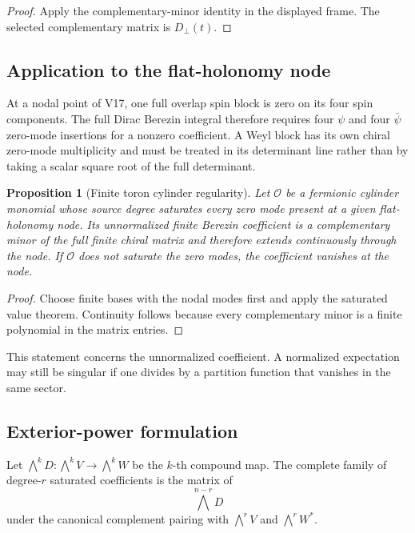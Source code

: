 \documentclass[11pt]{article}
\newtheorem{proposition}[theorem]{Proposition}
\begin{document}
\begin{proof}
Apply the complementary-minor identity in the displayed frame.  The
selected complementary matrix is \(D_\perp(t)\).
\end{proof}

\subsection{Application to the flat-holonomy node}

At a nodal point of V17, one full overlap spin block is zero on its four
spin components.  The full Dirac Berezin integral therefore requires four
\(\psi\) and four \(\bar\psi\) zero-mode insertions for a nonzero
coefficient.  A Weyl block has its own chiral zero-mode multiplicity and
must be treated in its determinant line rather than by taking a scalar
square root of the full determinant.

\begin{proposition}[Finite toron cylinder regularity]
\label{prop:v11v18-toron-regularity}
Let \(\mathcal O\) be a fermionic cylinder monomial whose source degree
saturates every zero mode present at a given flat-holonomy node.  Its
unnormalized finite Berezin coefficient is a complementary minor of the
full finite chiral matrix and therefore extends continuously through the
node.  If \(\mathcal O\) does not saturate the zero modes, the coefficient
vanishes at the node.
\end{proposition}

\begin{proof}
Choose finite bases with the nodal modes first and apply the saturated
value theorem.  Continuity follows because every complementary minor is
a finite polynomial in the matrix entries.
\end{proof}

This statement concerns the unnormalized coefficient.  A normalized
expectation may still be singular if one divides by a partition function
that vanishes in the same sector.

\subsection{Exterior-power formulation}

Let \(\bigwedge^kD:\bigwedge^kV\to\bigwedge^kW\) be the \(k\)-th
compound map.  The complete family of degree-\(r\) saturated coefficients
is the matrix of
\[
 \bigwedge^{n-r}D
 \tag{18.13}
\]
under the canonical complement pairing with
\(\bigwedge^rV\) and \(\bigwedge^rW^*\).
\end{document}
